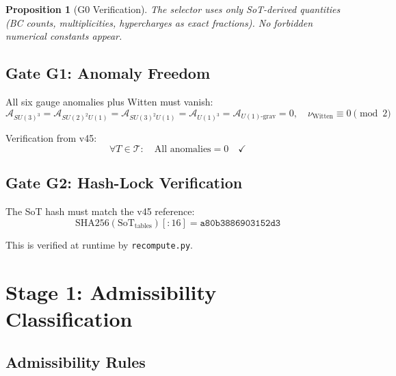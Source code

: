 \documentclass[11pt,a4paper]{article}
\newtheorem{proposition}{Proposition}[section]
\begin{document}
\begin{proposition}[G0 Verification]
\label{prop:g0}
The selector uses only SoT-derived quantities (BC counts, multiplicities,
hypercharges as exact fractions). No forbidden numerical constants appear.
\end{proposition}

\subsection{Gate G1: Anomaly Freedom}
\label{subsec:g1-check}

All six gauge anomalies plus Witten must vanish:
\begin{equation}
\label{eq:g1-anomalies}
\mathcal{A}_{SU(3)^3} = \mathcal{A}_{SU(2)^2U(1)} = \mathcal{A}_{SU(3)^2U(1)} = \mathcal{A}_{U(1)^3} = \mathcal{A}_{U(1)\text{-grav}} = 0, \quad \nu_{\text{Witten}} \equiv 0 \pmod{2}
\end{equation}

Verification from v45:
\begin{equation}
\label{eq:g1-result}
\forall T \in \mathcal{T}: \quad \text{All anomalies} = 0 \quad \checkmark
\end{equation}

\subsection{Gate G2: Hash-Lock Verification}
\label{subsec:g2-check}

The SoT hash must match the v45 reference:
\begin{equation}
\label{eq:g2-hash}
\text{SHA256}(\text{SoT}_{\text{tables}})[:16] = \texttt{a80b3886903152d3}
\end{equation}

This is verified at runtime by \texttt{recompute.py}.

\section{Stage 1: Admissibility Classification}
\label{sec:stage1-impl}

\subsection{Admissibility Rules}
\label{subsec:admissibility-rules}
\end{document}
